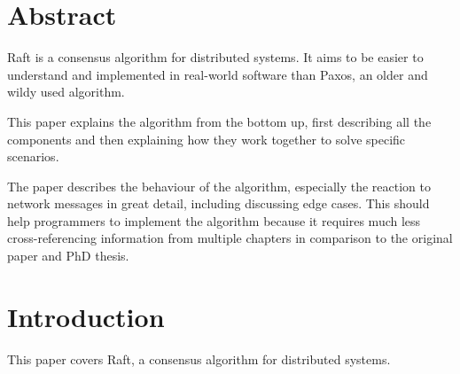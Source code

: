 




\begin{titlepage}
\afterpage{\restorepagecolor}
\newcommand{\colorRule}[3][black]{\textcolor[HTML]{#1}{\rule{#2}{#3}}}
\end{titlepage}
\restoregeometry



{
\hypersetup{linkcolor=}
\setcounter{tocdepth}{3}
\tableofcontents
\pagebreak
}

\section{Abstract}

Raft is a consensus algorithm for distributed systems. It aims to be easier to understand and implemented in real-world software than Paxos, an older and wildy used algorithm.

This paper explains the algorithm from the bottom up, first describing all the components and
then explaining how they work together to solve specific scenarios.

The paper describes the behaviour of the algorithm, especially the reaction to network messages
in great detail, including discussing edge cases. This should help programmers to implement
the algorithm because it requires much less cross-referencing information from multiple chapters in
comparison to the original paper and PhD thesis.

\section{Introduction}

This paper covers Raft, a consensus algorithm for distributed systems.


